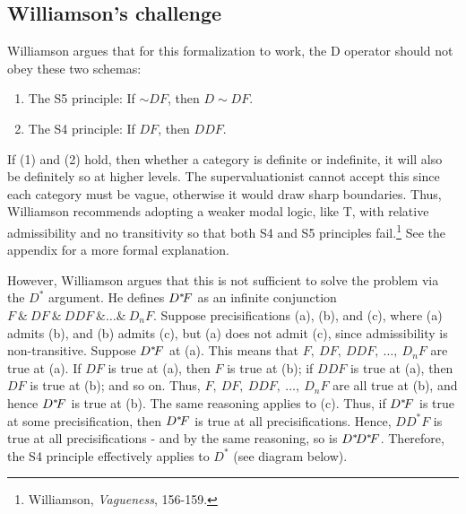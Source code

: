 \subsection{Williamson's challenge}

Williamson argues that for this formalization to work, the D operator
should not obey these two schemas:
\begin{enumerate}
\def\labelenumi{(\arabic{enumi})}
\item{The S5 principle: If ${\sim}DF$, then $D{\sim}DF$.}
\item{The S4 principle: If $DF$, then $DDF$.}
\end{enumerate}

If (1) and (2) hold, then whether a category is definite or indefinite,
it will also be definitely so at higher levels. The supervaluationist
cannot accept this since each category must be vague, otherwise it would
draw sharp boundaries. Thus, Williamson recommends adopting a weaker
modal logic, like T, with relative admissibility and no transitivity so
that both S4 and S5 principles fail.\footnote{Williamson,
  \emph{Vagueness}, 156-159.} See the appendix for a more formal
explanation.

However, Williamson argues that this is not sufficient to solve the
problem via the $D^*$ argument. He defines $D^*\hspace{-0.2em}F$ as an infinite
conjunction $F \ \&  \ DF \ \& \ DDF \ \& \ldots \& \ D_{n}F$. Suppose
precisifications (a), (b), and (c), where (a) admits (b), and (b) admits
(c), but (a) does not admit (c), since admissibility is non-transitive.
Suppose $D^*\hspace{-0.2em}F$ at (a). This means that
$F, \ DF, \ DDF, \ \ldots, \ D_{n}F$ are true at (a). If $DF$ is true at
(a), then $F$ is true at (b); if $DDF$ is true at (a), then $DF$
is true at (b); and so on. Thus, $F, \ DF, \ DDF, \ \ldots, \ D_{n}F$ are
all true at (b), and hence $D^*\hspace{-0.2em}F$ is true at (b). The same reasoning
applies to (c). Thus, if $D^*\hspace{-0.2em}F$ is true at some precisification,
then $D^*\hspace{-0.2em}F$ is true at all precisifications. Hence, ${DD}^{*}F$ is
true at all precisifications - and by the same reasoning, so is
$D^*\hspace{-0.2em}D^*\hspace{-0.2em}F$. Therefore, the S4 principle effectively applies to
$D^*$ (see diagram below).

